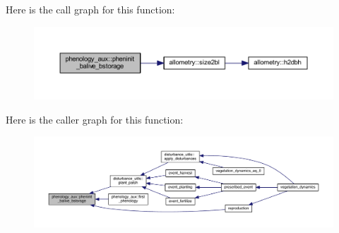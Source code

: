 Here is the call graph for this function\+:\nopagebreak
\begin{figure}[H]
\begin{center}
\leavevmode
\includegraphics[width=350pt]{namespacephenology__aux_a678dc0aeea995ed48f816c0588d15965_cgraph}
\end{center}
\end{figure}




Here is the caller graph for this function\+:\nopagebreak
\begin{figure}[H]
\begin{center}
\leavevmode
\includegraphics[width=350pt]{namespacephenology__aux_a678dc0aeea995ed48f816c0588d15965_icgraph}
\end{center}
\end{figure}


\hypertarget{namespacephenology__aux_ac2a698e44f1d2308f845a66ad92600e1}{}
